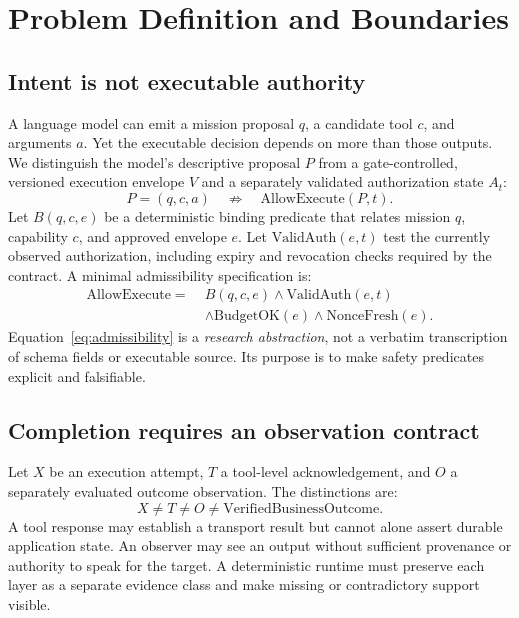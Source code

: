 \documentclass[11pt,twocolumn]{article}
\begin{document}
\section{Problem Definition and Boundaries}
\subsection{Intent is not executable authority}
A language model can emit a mission proposal $q$, a candidate tool $c$, and arguments $a$. Yet the executable decision depends on more than those outputs. We distinguish the model's descriptive proposal $P$ from a gate-controlled, versioned execution envelope $V$ and a separately validated authorization state $A_t$:
\begin{equation}
P=(q,c,a) \quad\not\Rightarrow\quad \mathrm{AllowExecute}(P,t).
\label{eq:intent}
\end{equation}
Let $B(q,c,e)$ be a deterministic binding predicate that relates mission $q$, capability $c$, and approved envelope $e$. Let $\mathrm{ValidAuth}(e,t)$ test the currently observed authorization, including expiry and revocation checks required by the contract. A minimal admissibility specification is:
\begin{equation}
\begin{split}
\mathrm{AllowExecute} =\;& B(q,c,e) \wedge \mathrm{ValidAuth}(e,t)\\
&\wedge\mathrm{BudgetOK}(e)\wedge\mathrm{NonceFresh}(e).
\end{split}
\label{eq:admissibility}
\end{equation}
Equation~\ref{eq:admissibility} is a \emph{research abstraction}, not a verbatim transcription of schema fields or executable source. Its purpose is to make safety predicates explicit and falsifiable.

\subsection{Completion requires an observation contract}
Let $X$ be an execution attempt, $T$ a tool-level acknowledgement, and $O$ a separately evaluated outcome observation. The distinctions are:
\begin{equation}
X \neq T \neq O \neq \mathrm{VerifiedBusinessOutcome}.
\label{eq:states}
\end{equation}
A tool response may establish a transport result but cannot alone assert durable application state. An observer may see an output without sufficient provenance or authority to speak for the target. A deterministic runtime must preserve each layer as a separate evidence class and make missing or contradictory support visible.
\end{document}
